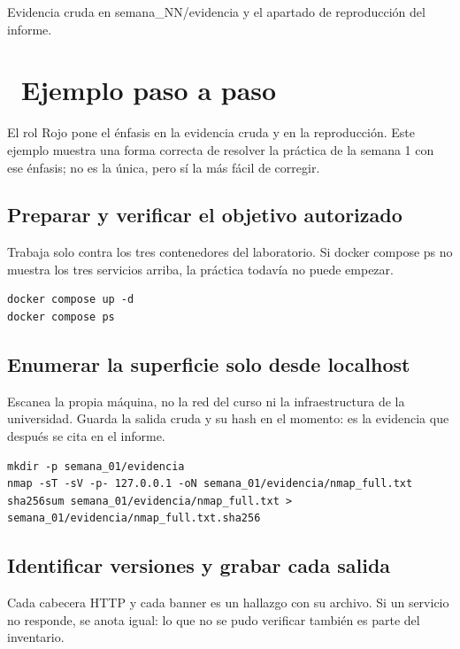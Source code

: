 \documentclass[11pt,a4paper]{article}
\newcommand{\iconotexto}[2]{\textcolor{cyanNeon}{\faIcon{#1}}~#2}
\begin{document}
Evidencia cruda en semana\_NN/evidencia y el apartado de reproducción del informe.

\section{\iconotexto{list-ol}{Ejemplo paso a paso}}

El rol Rojo pone el énfasis en la evidencia cruda y en la reproducción. Este ejemplo muestra una forma correcta de resolver la práctica de la semana 1 con ese énfasis; no es la única, pero sí la más fácil de corregir.

\subsection{Preparar y verificar el objetivo autorizado}

Trabaja solo contra los tres contenedores del laboratorio. Si docker compose ps no muestra los tres servicios arriba, la práctica todavía no puede empezar.

\begin{lstlisting}[style=estiloCodigo]
docker compose up -d
docker compose ps
\end{lstlisting}

\subsection{Enumerar la superficie solo desde localhost}

Escanea la propia máquina, no la red del curso ni la infraestructura de la universidad. Guarda la salida cruda y su hash en el momento: es la evidencia que después se cita en el informe.

\begin{lstlisting}[style=estiloCodigo]
mkdir -p semana_01/evidencia
nmap -sT -sV -p- 127.0.0.1 -oN semana_01/evidencia/nmap_full.txt
sha256sum semana_01/evidencia/nmap_full.txt > semana_01/evidencia/nmap_full.txt.sha256
\end{lstlisting}

\subsection{Identificar versiones y grabar cada salida}

Cada cabecera HTTP y cada banner es un hallazgo con su archivo. Si un servicio no responde, se anota igual: lo que no se pudo verificar también es parte del inventario.
\end{document}
